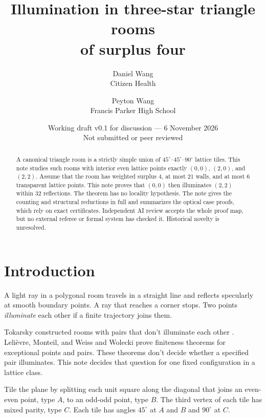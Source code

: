 \documentclass[11pt]{article}
\title{Illumination in three-star triangle rooms\\of surplus four}
\author{Daniel Wang\\\small Citizen Health \and Peyton Wang\\\small Francis Parker High School}
\date{Working draft v0.1 for discussion --- 6 November 2026\\\small Not submitted or peer reviewed}
\theoremstyle{remark}
\begin{document}
\maketitle
\vspace{-1.2em}
\begin{abstract}
A canonical triangle room is a strictly simple union of $45^\circ$--$45^\circ$--$90^\circ$ lattice tiles.
This note studies such rooms with interior even lattice points exactly $(0,0)$, $(2,0)$, and $(2,2)$.
Assume that the room has weighted surplus 4, at most 21 walls, and at most 6 transparent lattice points. This note proves that $(0,0)$ then illuminates $(2,2)$ within 32 reflections.
The theorem has no locality hypothesis.
The note gives the counting and structural reductions in full and summarizes the optical case proofs, which rely on exact certificates.
Independent AI review accepts the whole proof map, but no external referee or formal system has checked it.
Historical novelty is unresolved.
\end{abstract}

\section{Introduction}
A light ray in a polygonal room travels in a straight line and reflects specularly at smooth boundary points. A ray that reaches a corner stops. Two points \emph{illuminate} each other if a finite trajectory joins them.

Tokarsky constructed rooms with pairs that don't illuminate each other \cite{Tokarsky1995}. Lelièvre, Monteil, and Weiss \cite[Theorem~2]{LMW2016} and Wolecki \cite[Theorem~1.2(i)]{Wolecki2024} prove finiteness theorems for exceptional points and pairs. These theorems don't decide whether a specified pair illuminates. This note decides that question for one fixed configuration in a lattice class.

Tile the plane by splitting each unit square along the diagonal that joins an even-even point, type $A$, to an odd-odd point, type $B$. The third vertex of each tile has mixed parity, type $C$. Each tile has angles $45^\circ$ at $A$ and $B$ and $90^\circ$ at $C$.
\end{document}
